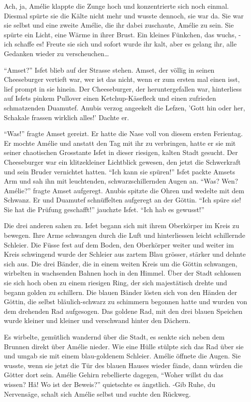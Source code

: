 \documentclass[11pt,titlepage,a5paper]{book}
\begin{document}
 Ach, ja, Amélie klappte die Zunge hoch und konzentrierte sich noch einmal. Diesmal spürte sie die Kälte nicht mehr und wusste dennoch, sie war da. Sie war sie selbst und eine zweite Amélie, die ihr dabei zuschaute, Amélie zu sein. Sie spürte ein Licht, eine Wärme in ihrer Brust. Ein kleines Fünkchen, das wuchs, -ich schaffe es! Freute sie sich und sofort wurde ihr kalt, aber es gelang ihr, alle Gedanken wieder zu verscheuchen\dots

"`Amset?"' Isfet blieb auf der Strasse stehen. Amset, der völlig in seinen Cheeseburger vertieft war, wer ist das nicht, wenn er zum ersten mal einen isst, lief prompt in sie hinein. Der Cheeseburger, der heruntergefallen war, hinterliess auf Isfets pinkem Pullover einen Ketchup-Käsefleck und einen zufrieden schmatzenden Duamutef. Anubis verzog angeekelt die Lefzen, 'Gott hin oder her, Schakale frassen wirklich alles!' Dachte er.

"`Was!"' fragte Amset gereizt. Er hatte die Nase voll von diesem ersten Ferientag. Er mochte Amélie und anstatt den Tag mit ihr zu verbringen, hatte er sie mit seiner chaotischen Grosstante Isfet in dieser riesigen, kalten Stadt gesucht. Der Cheeseburger war ein klitzekleiner Lichtblick gewesen, den jetzt die Schwerkraft und sein Bruder vernichtet hatten. "`Ich kann sie spüren!"' Isfet packte Amsets Arm und sah ihn mit leuchtenden, schwarzschillernden Augen an. "`Was? Wen? Amélie?"' fragte Amset aufgeregt. Anubis spitzte die Ohren und wedelte mit dem Schwanz. Er und Duamutef schnüffelten aufgeregt an der Göttin. "`Ich spüre sie! Sie hat die Prüfung geschafft!"' jauchzte Isfet. "`Ich hab es gewusst!"' 

 Die drei anderen sahen zu. Isfet begann sich mit ihrem Oberkörper im Kreis zu bewegen. Ihre Arme schwangen durch die Luft und hinterliessen leicht schillernde Schleier. Die Füsse fest auf dem Boden, den Oberkörper weiter und weiter im Kreis schwingend wurde der Schleier aus zartem Blau grösser, stärker und dehnte sich aus. Die drei Bänder, die in einem weiten Kreis um die Göttin schwangen, wirbelten in wachsenden Bahnen hoch in den Himmel. Über der Stadt schlossen sie sich hoch oben zu einem riesigen Ring, der sich majestätisch drehte und begann golden zu schillern. Die blauen Bänder lösten sich von den Händen der Göttin, die selbst bläulich-schwarz zu schimmern begonnen hatte und wurden von dem drehenden Rad aufgesogen. Das goldene Rad, mit den drei blauen Speichen wurde kleiner und kleiner und verschwand hinter den Dächern. 
 
 Es wirbelte, gemütlich wandernd über die Stadt, es senkte sich neben dem Brunnen direkt über Amélie nieder. Wie eine Hülle stülpte sich das Rad über sie und umgab sie mit einem blau-goldenem Schleier. Amélie öffnete die Augen. Sie wusste, wenn sie jetzt die Tür des blauen Hauses wieder fände, dann würden die Götter dort sein. Amélie Gehirn rebellierte dagegen, "`Woher willst du das wissen? Hä! Wo ist der Beweis?"' quietschte es ängstlich. -Gib Ruhe, du Nervensäge, schalt sich Amélie selbst und suchte den Rückweg. 
\end{document}
